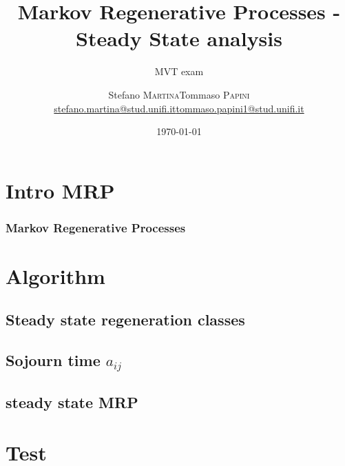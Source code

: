 





\title[MRP Steady State]{\textbf{Markov Regenerative Processes -
    Steady State analysis}}
\date[\today]{\flushright \today}
\subtitle{MVT exam}

\author[Martina - Papini]{
  \begin{center}
    \begin{tabular}{ll}
      Stefano \textsc{Martina}&Tommaso \textsc{Papini}\\
      \href{mailto:stefano.martina@stud.unifi.it}{stefano.martina@stud.unifi.it}&
      \href{mailto:tommaso.papini1@stud.unifi.it}{tommaso.papini1@stud.unifi.it}
    \end{tabular}
  \end{center}
}



\begin{frame}[plain]
  \titlepage
\end{frame}

\section{Intro MRP}
\begin{frame}
  \frametitle{Markov Regenerative Processes}
  
\end{frame}

\section{Algorithm}
\subsection{Steady state regeneration classes}
\subsection{Sojourn time $a_{ij}$}
\subsection{steady state MRP}
\section{Test}

